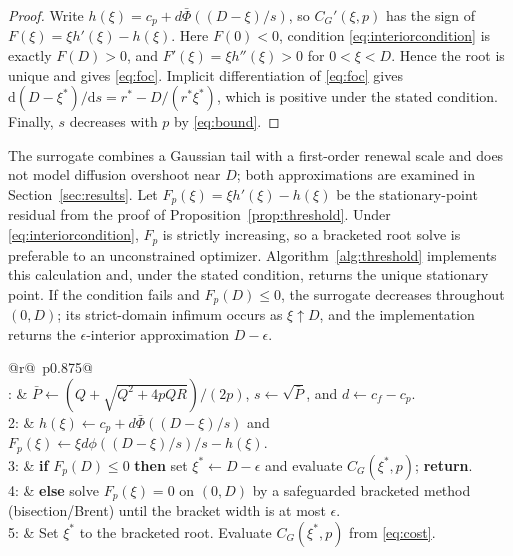 \documentclass[journal]{IEEEtran}
\newcommand{\Pb}{\bar{P}}
\begin{document}
\begin{proof}
Write $h(\xi)=c_p+d\bar\Phi((D-\xi)/s)$, so $C_G'(\xi,p)$ has the sign of
$F(\xi)=\xi h'(\xi)-h(\xi)$. Here $F(0)<0$, condition
\eqref{eq:interiorcondition} is exactly $F(D)>0$, and
$F'(\xi)=\xi h''(\xi)>0$ for $0<\xi<D$. Hence the root is unique and gives
\eqref{eq:foc}. Implicit differentiation of \eqref{eq:foc} gives
$\mathrm d(D-\xi^*)/\mathrm ds=r^*-D/(r^*\xi^*)$, which is positive under
the stated condition. Finally, $s$ decreases with $p$ by \eqref{eq:bound}.
\end{proof}

The surrogate combines a Gaussian tail with a first-order renewal scale and
does not model diffusion overshoot near $D$; both approximations are examined
in Section~\ref{sec:results}. Let
$F_p(\xi)=\xi h'(\xi)-h(\xi)$ be the stationary-point residual from the proof
of Proposition~\ref{prop:threshold}. Under
\eqref{eq:interiorcondition}, $F_p$ is strictly increasing, so a bracketed root
solve is preferable to an unconstrained optimizer. Algorithm~\ref{alg:threshold}
implements this calculation and, under the stated condition, returns the
unique stationary point. If the condition fails and $F_p(D)\leq0$, the
surrogate decreases throughout $(0,D)$; its strict-domain infimum occurs as
$\xi\uparrow D$, and the implementation returns the $\epsilon$-interior
approximation $D-\epsilon$.

\begin{algorithm}[!t]
\caption{PM threshold informed by the network}
\label{alg:threshold}
\scriptsize
\setlength{\tabcolsep}{2pt}
\begin{tabular}{@{}r@{\ }p{}@{}}
\toprule
{}\\
: & $\Pb\leftarrow(Q+\sqrt{Q^2+4pQR})/(2p)$,
$s\leftarrow\sqrt{\Pb}$, and $d\leftarrow c_f-c_p$.\\
2: & $h(\xi)\leftarrow c_p+d\bar\Phi((D-\xi)/s)$ and
$F_p(\xi)\leftarrow\xi d\phi((D-\xi)/s)/s-h(\xi)$.\\
3: & \textbf{if} $F_p(D)\leq0$ \textbf{then} set $\xi^*\leftarrow D-\epsilon$
and evaluate $C_G(\xi^*,p)$; \textbf{return}.\\
4: & \textbf{else} solve $F_p(\xi)=0$ on $(0,D)$ by a safeguarded bracketed
method (bisection/Brent) until the bracket width is at most $\epsilon$.\\
5: & Set $\xi^*$ to the bracketed root. Evaluate $C_G(\xi^*,p)$ from
\eqref{eq:cost}.\\
\midrule
{}\\
\bottomrule
\end{tabular}
\end{algorithm}
\end{document}
